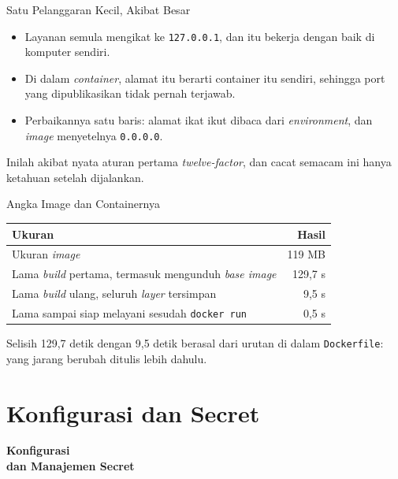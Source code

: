 \documentclass[aspectratio=169, table, 12pt]{beamer}
\begin{document}
\begin{frame}{{\Large Satu Pelanggaran Kecil, Akibat Besar}}
  \vspace{12pt}
  \begin{itemize}
    \item Layanan semula mengikat ke \texttt{127.0.0.1}, dan itu bekerja
          dengan baik di komputer sendiri.
    \item Di dalam \textit{container}, alamat itu berarti container itu
          sendiri, sehingga port yang dipublikasikan tidak pernah terjawab.
    \item Perbaikannya satu baris: alamat ikat ikut dibaca dari
          \textit{environment}, dan \textit{image} menyetelnya
          \texttt{0.0.0.0}.
  \end{itemize}
  \vspace{8pt}
  {\small Inilah akibat nyata aturan pertama \textit{twelve-factor}, dan
  cacat semacam ini hanya ketahuan setelah dijalankan.}
\end{frame}

\begin{frame}{{\Large Angka Image dan Containernya}}
  \vspace{6pt}
  \centering
  {\footnotesize
  \begin{tabularx}{\textwidth}{Yr}
    \hline
    \textbf{Ukuran} & \textbf{Hasil} \\
    \hline
    Ukuran \textit{image} & 119 MB \\
    \hline
    Lama \textit{build} pertama, termasuk mengunduh \textit{base image} & 129,7 s \\
    \hline
    Lama \textit{build} ulang, seluruh \textit{layer} tersimpan & 9,5 s \\
    \hline
    Lama sampai siap melayani sesudah \texttt{docker run} & 0,5 s \\
    \hline
  \end{tabularx}}

  \vspace{8pt}
  {\small Selisih 129,7 detik dengan 9,5 detik berasal dari urutan di dalam
  \texttt{Dockerfile}: yang jarang berubah ditulis lebih dahulu.}
\end{frame}

\section{Konfigurasi dan Secret}

\begin{frame}{\hfill}
  \centering
  \Huge{\textbf{Konfigurasi\\dan Manajemen Secret}}
\end{frame}
\end{document}
